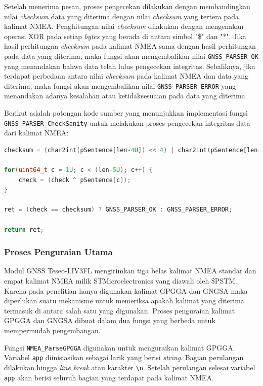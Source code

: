 Setelah menerima pesan, proses pengecekan dilakukan dengan membandingkan nilai \textit{checksum} data yang diterima dengan nilai \textit{checksum} yang tertera pada kalimat NMEA. Penghitungan nilai \textit{checksum} dilakukan dengan mengenakan operasi XOR pada setiap \textit{bytes} yang berada di antara simbol "\$" dan "*". Jika hasil perhitungan \textit{checksum} pada kalimat NMEA sama dengan hasil perhitungan pada data yang diterima, maka fungsi akan mengembalikan nilai \texttt{GNSS\_PARSER\_OK} yang menandakan bahwa data telah lulus pengecekan integritas. Sebaliknya, jika terdapat perbedaan antara nilai \textit{checksum} pada kalimat NMEA dan data yang diterima, maka fungsi akan mengembalikan nilai \texttt{GNSS\_PARSER\_ERROR} yang menandakan adanya kesalahan atau ketidaksesuaian pada data yang diterima.

Berikut adalah potongan kode sumber yang menunjukkan implementasi fungsi \texttt{GNSS\_PARSER\_CheckSanity} untuk melakukan proses pengecekan integritas data dari kalimat NMEA:
\begin{lstlisting}[language=c]
checksum = (char2int(pSentence[len-4U]) << 4) | char2int(pSentence[len-3U]);
		
for(uint64_t c = 1U; c < (len-5U); c++) {
	check = (check ^ pSentence[c]);
}
		
ret = (check == checksum) ? GNSS_PARSER_OK : GNSS_PARSER_ERROR;
	
return ret;
\end{lstlisting}

\subsubsection{Proses Penguraian Utama}
Modul GNSS Teseo-LIV3FL mengirimkan tiga belas kalimat NMEA standar dan empat kalimat NMEA milik STMicroelectronics yang diawali oleh \$PSTM. Karena pada penelitian hanya digunakan kalimat GPGGA dan GNGSA maka diperlukan suatu mekanisme untuk memeriksa apakah kalimat yang diterima termasuk di antara salah satu yang digunakan. Proses penguraian kalimat GPGGA dan GNGSA dibuat dalam dua fungsi yang berbeda untuk mempermudah pengembangan. 

Fungsi \texttt{NMEA\_ParseGPGGA} digunakan untuk menguraikan kalimat GPGGA. Variabel \texttt{app} diinisiasikan sebagai larik yang berisi \textit{string}. Bagian perulangan dilakukan hingga \textit{line break} atau karakter \texttt{\textbackslash n}. Setelah perulangan selesai variabel \texttt{app} akan berisi seluruh bagian yang terdapat pada kalimat NMEA. 

